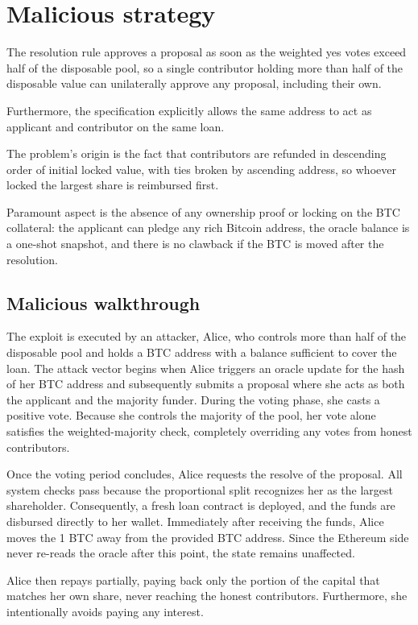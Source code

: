\documentclass{report}
\begin{document}
\section*{Malicious strategy}
The resolution rule approves a proposal as soon as the weighted yes votes exceed half of the disposable pool, so a single contributor holding more than half of the disposable value can unilaterally approve any proposal, including their own. 

Furthermore, the specification explicitly allows the same address to act as applicant and contributor on the same loan. 

The problem's origin is the fact that contributors are refunded in descending order of initial locked value, with ties broken by ascending address, so whoever locked the largest share is reimbursed first. 

Paramount aspect is the absence of any ownership proof or locking on the BTC collateral: the applicant can pledge any rich Bitcoin address, the oracle balance is a one-shot snapshot, and there is no clawback if the BTC is moved after the resolution.

\subsection*{Malicious walkthrough}
The exploit is executed by an attacker, Alice, who controls more than half of the disposable pool and holds a BTC address with a balance sufficient to cover the loan. The attack vector begins when Alice triggers an oracle update for the hash of her BTC address and subsequently submits a proposal where she acts as both the applicant and the majority funder. During the voting phase, she casts a positive vote. Because she controls the majority of the pool, her vote alone satisfies the weighted-majority check, completely overriding any votes from honest contributors.

Once the voting period concludes, Alice requests the resolve of the proposal. All system checks pass because the proportional split recognizes her as the largest shareholder. Consequently, a fresh loan contract is deployed, and the funds are disbursed directly to her wallet. Immediately after receiving the funds, Alice moves the 1 BTC away from the provided BTC address. Since the Ethereum side never re-reads the oracle after this point, the state remains unaffected.

Alice then repays partially, paying back only the portion of the capital that matches her own share, never reaching the honest contributors. Furthermore, she intentionally avoids paying any interest. 
\end{document}
